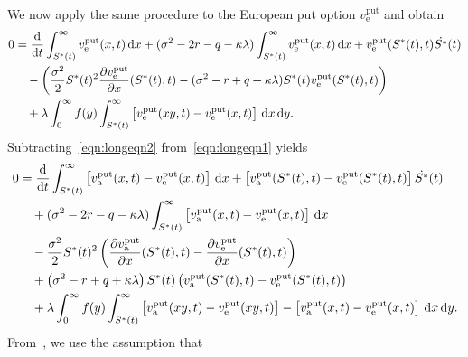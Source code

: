         	We now apply the same procedure to the European put option $ v_{\text{e}}^{\text{put}}$ and obtain
        	 	\begin{equation}
        		\label{eqn:longeqn2}
        		\begin{split}
        		0 &= \frac{\mathrm d}{\mathrm d t}\int_{S^*(t)}^\infty  v_{\text{e}}^{\text{put}}(x,t) \, \mathrm d x + (\sigma^2 - 2r -q -\kappa\lambda)\int_{S^*(t)}^\infty  v_{\text{e}}^{\text{put}}(x,t) \, \mathrm d x +  v_{\text{e}}^{\text{put}}(S^*(t),t)\dot{S^*}(t) \\
        		&\quad{} -\left( \frac{\sigma^2}{2}S^*(t)^2\frac{\partial  v_{\text{e}}^{\text{put}}}{\partial x}(S^*(t),t) - (\sigma^2 - r + q + \kappa\lambda) S^*(t)v_{\text{e}}^{\text{put}}(S^*(t),t) \right) \\
        		&\quad{} +\lambda\int_0^\infty f(y) \int_{S^*(t)}^\infty \left[ v_{\text{e}}^{\text{put}}(xy,t) -  v_{\text{e}}^{\text{put}}(x,t)\right] \, \mathrm d x \, \mathrm d y.
        		\end{split}
        	\end{equation}
        	Subtracting~\eqref{eqn:longeqn2} from~\eqref{eqn:longeqn1} yields
        	\begin{equation}
        		\label{eqn:longeqn3}
        		\begin{split}
			 0 &= \frac{\mathrm d}{\mathrm d t}\int_{S^*(t)}^\infty \left[v_{\text{a}}^{\text{put}}(x,t) -  v_{\text{e}}^{\text{put}}(x,t)\right] \, \mathrm d x + \left[ v_{\text{a}}^{\text{put}}(S^*(t),t) -  v_{\text{e}}^{\text{put}}(S^*(t),t) \right]\dot{S^*}(t)\\
			&\quad{} + (\sigma^2 - 2r -q -\kappa\lambda)\int_{S^*(t)}^\infty \left[v_{\text{a}}^{\text{put}}(x,t) -  v_{\text{e}}^{\text{put}}(x,t)\right] \, \mathrm d x  \\
        		&\quad{} -\frac{\sigma^2}{2}S^*(t)^2 \left( \frac{\partial v_{\text{a}}^{\text{put}}}{\partial x}(S^*(t),t) - \frac{\partial  v_{\text{e}}^{\text{put}}}{\partial x}(S^*(t),t) \right) \\
        		&\quad{} + \left(\sigma^2 - r + q + \kappa\lambda\right)S^*(t)\left(v_{\text{a}}^{\text{put}}(S^*(t),t)- v_{\text{e}}^{\text{put}}(S^*(t),t) \right) \\
        		&\quad{} +\lambda\int_0^\infty f(y) \int_{S^*(t)}^\infty \left[ v_{\text{a}}^{\text{put}}(xy,t) -  v_{\text{e}}^{\text{put}}(xy,t) \right] - \left[ v_{\text{a}}^{\text{put}}(x,t) -  v_{\text{e}}^{\text{put}}(x,t)\right] \, \mathrm d x \, \mathrm d y.
			\end{split}
		\end{equation}
		From~\cite{Rodrigo2013}, we use the assumption that

